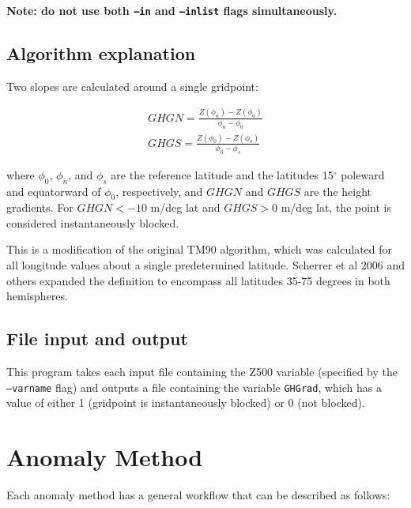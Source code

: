 \documentclass{article}
\begin{document}
\textbf{Note: do not use both \texttt{--in} and \texttt{--inlist} flags simultaneously.}

\subsection{Algorithm explanation}

Two slopes are calculated around a single gridpoint:

\begin{eqnarray}
GHGN=\frac{Z(\phi_n)-Z(\phi_0)}{\phi_n-\phi_0}\\
GHGS=\frac{Z(\phi_0)-Z(\phi_s)}{\phi_0-\phi_s}
\end{eqnarray}

\noindent where $\phi_0$, $\phi_n$, and $\phi_s$ are the reference latitude and the latitudes 15$^\circ$ poleward and equatorward of $\phi_0$, respectively, and $GHGN$ and $GHGS$ are the height gradients. For $GHGN<-10$ m/deg lat and $GHGS>0$ m/deg lat, the point is considered instantaneously blocked.

This is a modification of the original TM90 algorithm, which was calculated for all longitude values about a single predetermined latitude. Scherrer et al 2006 and others expanded the definition to encompass all latitudes 35-75 degrees in both hemispheres.


\subsection{File input and output}


This program takes each input file containing the Z500 variable (specified by the \texttt{--varname} flag) and outputs a file containing the variable \texttt{GHGrad}, which has a value of either 1 (gridpoint is instantaneously blocked) or 0 (not blocked).

\section{Anomaly Method}\label{anom}

Each anomaly method has a general workflow that can be described as follows:
\end{document}
